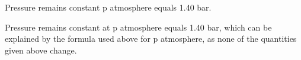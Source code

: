Pressure remains constant p atmosphere equals 1.40 bar.

Pressure remains constant at p atmosphere equals 1.40 bar, which can be explained by the formula used above for p atmosphere, as none of the quantities given above change.